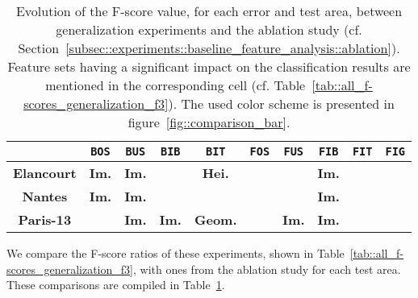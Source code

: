         \begin{table}[htbp]
            \footnotesize 
            \centering
            \renewcommand{\arraystretch}{2}
            \begin{tabular}{| c | c c c c |c c c c c|}
                \hline
                & \texttt{BOS} & \texttt{BUS} & \texttt{BIB} & \texttt{BIT} & \texttt{FOS} & \texttt{FUS} & \texttt{FIB} & \texttt{FIT} & \texttt{FIG} \\
                \hline
                \textbf{Elancourt} & \cellcolor{LOSS3545} \textbf{Im.} & \cellcolor{LOSS3545} \textbf{Im.} & \cellcolor{LOSS2535} & \cellcolor{LOSS1525} \textbf{Hei.} & \cellcolor{STBL} & \cellcolor{GAIN45} & \cellcolor{GAIN2535} \textbf{Im.} & \cellcolor{LOSS1525} & \cellcolor{GAIN0515} \\
                \textbf{Nantes} & \cellcolor{STBL} \textbf{Im.} & \cellcolor{LOSS1525} \textbf{Im.} &  & \cellcolor{GAIN1525} & \cellcolor{STBL} & \cellcolor{STBL} & \cellcolor{LOSS0515} \textbf{Im.} & & \cellcolor{STBL} \\
                \textbf{Paris-13} & \cellcolor{LOSS0515} & \cellcolor{STBL} \textbf{Im.} & \cellcolor{GAIN1525} \textbf{Im.} & \cellcolor{GAIN0515} \textbf{Geom.} & \cellcolor{STBL} & \cellcolor{LOSS45} \textbf{Im.} & \cellcolor{STBL} \textbf{Im.} & \cellcolor{GAIN0515} & \cellcolor{LOSS0515} \\
                \hline
            \end{tabular}
            \renewcommand{\arraystretch}{1}
            \caption[
                Evolution of the F-score value, for each error and test area, between generalization experiments and the ablation study.
            ]{
                \label{tab::generalization_comparison}
                Evolution of the F-score value, for each error and test area, between generalization experiments and the ablation study (cf. Section~\ref{subsec::experiments::baseline_feature_analysis::ablation}).
                Feature sets having a significant impact on the classification results are mentioned in the corresponding cell (cf. Table~\ref{tab::all_f-scores_generalization_f3}).
                The used color scheme is presented in figure~\ref{fig::comparison_bar}.
            }
        \end{table}
            
        We compare the F-score ratios of these experiments, shown in Table~\ref{tab::all_f-scores_generalization_f3}, with ones from the ablation study for each test area.
        These comparisons are compiled in Table~\ref{tab::generalization_comparison}.\\
    
